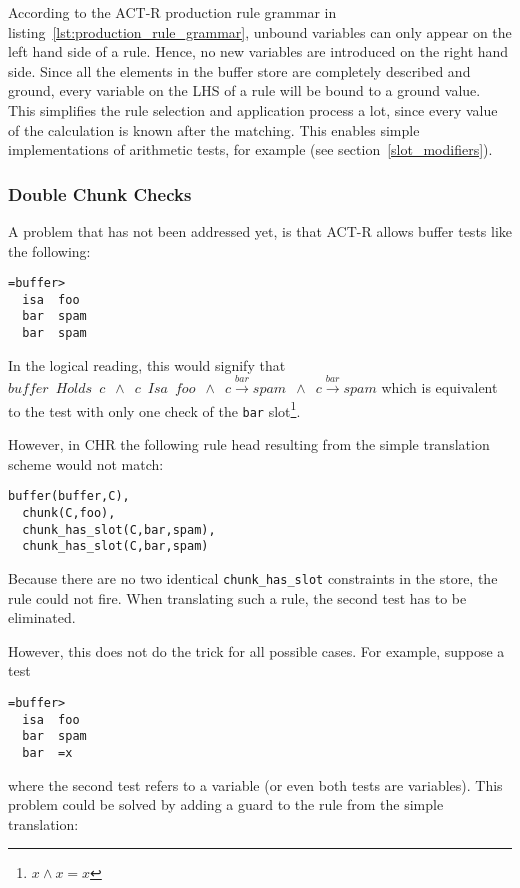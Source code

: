 According to the ACT-R production rule grammar in listing~\ref{lst:production_rule_grammar}, unbound variables can only appear on the left hand side of a rule. Hence, no new variables are introduced on the right hand side. Since all the elements in the buffer store are completely described and ground, every variable on the LHS of a rule will be bound to a ground value. This simplifies the rule selection and application process a lot, since every value of the calculation is known after the matching. This enables simple implementations of arithmetic tests, for example (see section~\ref{slot_modifiers}).

\subsubsection{Double Chunk Checks}

A problem that has not been addressed yet, is that ACT-R allows buffer tests like the following:

\begin{lstlisting}
=buffer>
  isa  foo
  bar  spam
  bar  spam
\end{lstlisting}

In the logical reading, this would signify that $buffer \enspace Holds \enspace c \enspace \wedge \enspace c \enspace Isa \enspace foo \enspace \wedge \enspace c \xrightarrow{bar} spam \enspace \wedge \enspace c \xrightarrow{bar} spam$ which is equivalent to the test with only one check of the \verb|bar| slot\footnote{$x \wedge x = x$}.

However, in CHR the following rule head resulting from the simple translation scheme would not match:

\begin{lstlisting}
buffer(buffer,C),
  chunk(C,foo),
  chunk_has_slot(C,bar,spam),
  chunk_has_slot(C,bar,spam)
\end{lstlisting}

Because there are no two identical \verb|chunk_has_slot| constraints in the store, the rule could not fire. When translating such a rule, the second test has to be eliminated.

However, this does not do the trick for all possible cases. For example, suppose a test

\begin{lstlisting}
=buffer>
  isa  foo
  bar  spam
  bar  =x
\end{lstlisting}

where the second test refers to a variable (or even both tests are variables). This problem could be solved by adding a guard to the rule from the simple translation:

